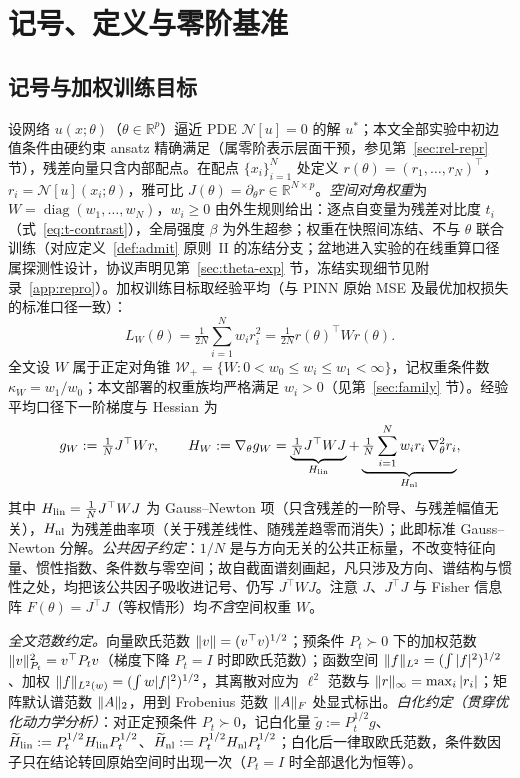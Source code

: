 \documentclass[fontset=windows,11pt]{ctexart}
\DeclarePairedDelimiter{\norm}{\lVert}{\rVert}
\newcommand{\R}{\mathbb R}
\newcommand{\W}{W}
\newcommand{\wt}[1]{\widetilde{#1}}
\DeclareMathOperator{\diag}{diag}
\numberwithin{equation}{section}
\begin{document}
\section{记号、定义与零阶基准}\label{sec:framework}

\subsection{记号与加权训练目标}\label{sec:notation}
设网络 $u(x;\theta)$（$\theta\in\R^p$）逼近 PDE $\mathcal N[u]=0$ 的解 $u^*$；本文全部实验中初边值条件由硬约束 ansatz 精确满足（属零阶表示层面干预，参见第~\ref{sec:rel-repr} 节），残差向量只含内部配点。在配点 $\{x_i\}_{i=1}^{N}$ 处定义 $r(\theta)=(r_1,\dots,r_N)^\top$，$r_i=\mathcal N[u](x_i;\theta)$，雅可比 $J(\theta)=\partial_\theta r\in\R^{N\times p}$。\emph{空间对角权重}为 $\W=\diag(w_1,\dots,w_N)$，$w_i\ge0$ 由外生规则给出：逐点自变量为残差对比度 $t_i$（式~\eqref{eq:t-contrast}），全局强度 $\beta$ 为外生超参；权重在快照间冻结、不与 $\theta$ 联合训练（对应定义~\ref{def:admit} 原则~II 的冻结分支；盆地进入实验的在线重算口径属探测性设计，协议声明见第~\ref{sec:theta-exp} 节，冻结实现细节见附录~\ref{app:repro}）。加权训练目标取经验平均（与 PINN 原始 MSE 及最优加权损失的标准口径一致\cite{Raissi2019,vanDerMeer2020}）：
\begin{equation}\label{eq:lw}
L_{\W}(\theta)=\tfrac{1}{2N}\sum_{i=1}^{N}w_i r_i^2=\tfrac{1}{2N} r(\theta)^\top \W r(\theta).
\end{equation}
全文设 $\W$ 属于正定对角锥 $\mathcal W_+=\{\W:0<w_0\le w_i\le w_1<\infty\}$，记权重条件数 $\kappa_{\W}=w_1/w_0$；本文部署的权重族均严格满足 $w_i>0$（见第~\ref{sec:family} 节）。经验平均口径下一阶梯度与 Hessian 为
\begin{equation}\label{eq:h-split}
g_{\W}:=\tfrac1N J^\top\W r,\qquad
H_{\W}:=\nabla_\theta g_{\W}
=\underbrace{\tfrac1N J^\top\W J}_{H_{\rm lin}}
+\underbrace{\tfrac1N\sum_{i=1}^{N}w_i r_i\,\nabla_\theta^2 r_i}_{H_{\rm nl}} ,
\end{equation}
其中 $H_{\rm lin}=\tfrac1N J^\top\W J$ 为 Gauss--Newton 项（只含残差的一阶导、与残差幅值无关），$H_{\rm nl}$ 为残差曲率项（关于残差线性、随残差趋零而消失）；此即标准 Gauss--Newton 分解。\emph{公共因子约定}：$1/N$ 是与方向无关的公共正标量，不改变特征向量、惯性指数、条件数与零空间；故自截面谱刻画起，凡只涉及方向、谱结构与惯性之处，均把该公共因子吸收进记号、仍写 $J^\top\W J$。注意 $J$、$J^\top J$ 与 Fisher 信息阵 $F(\theta)=J^\top J$（等权情形）均\emph{不含}空间权重 $\W$。

\noindent\emph{全文范数约定。}向量欧氏范数 $\norm v=(v^\top v)^{1/2}$；预条件 $P_t\succ0$ 下的加权范数 $\norm v_{P_t}^2=v^\top P_t v$（梯度下降 $P_t=I$ 时即欧氏范数）；函数空间 $\norm f_{L^2}=(\int|f|^2)^{1/2}$、加权 $\norm f_{L^2(w)}=(\int w|f|^2)^{1/2}$，其离散对应为 $\ell^2$ 范数与 $\norm r_\infty=\max_i|r_i|$；矩阵默认谱范数 $\norm A_2$，用到 Frobenius 范数 $\norm A_F$ 处显式标出。\emph{白化约定（贯穿优化动力学分析）}：对正定预条件 $P_t\succ0$，记白化量 $\wt g:=P_t^{1/2}g$、$\wt H_{\rm lin}:=P_t^{1/2}H_{\rm lin}P_t^{1/2}$、$\wt H_{\rm nl}:=P_t^{1/2}H_{\rm nl}P_t^{1/2}$；白化后一律取欧氏范数，条件数因子只在结论转回原始空间时出现一次（$P_t=I$ 时全部退化为恒等）。
\end{document}
